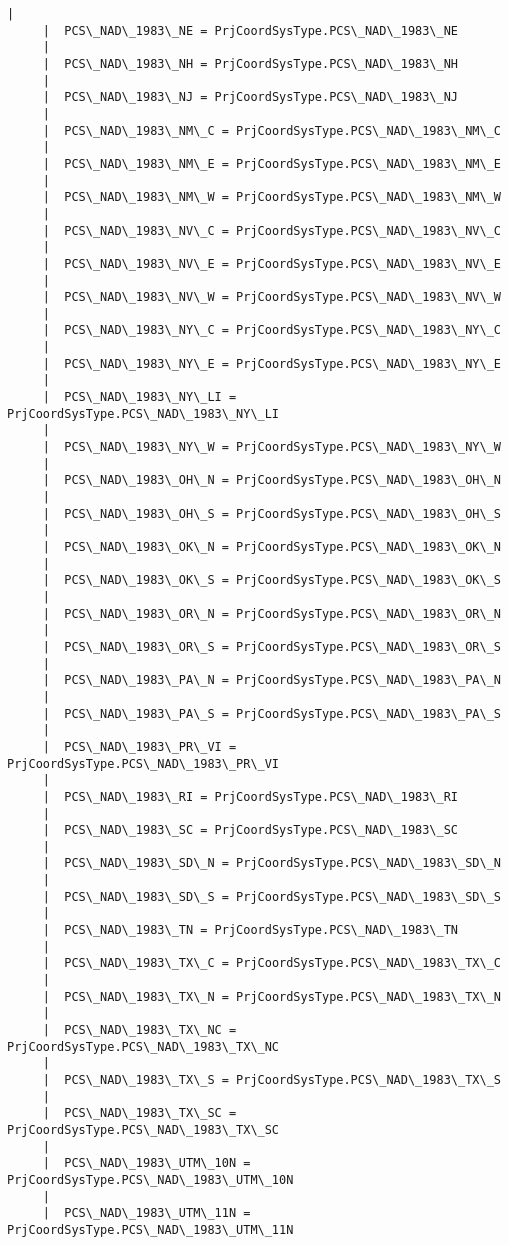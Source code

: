 \documentclass[11pt]{article}
\begin{document}
\begin{Verbatim}[commandchars=\\\{\}]
     |  
     |  PCS\_NAD\_1983\_NE = PrjCoordSysType.PCS\_NAD\_1983\_NE
     |  
     |  PCS\_NAD\_1983\_NH = PrjCoordSysType.PCS\_NAD\_1983\_NH
     |  
     |  PCS\_NAD\_1983\_NJ = PrjCoordSysType.PCS\_NAD\_1983\_NJ
     |  
     |  PCS\_NAD\_1983\_NM\_C = PrjCoordSysType.PCS\_NAD\_1983\_NM\_C
     |  
     |  PCS\_NAD\_1983\_NM\_E = PrjCoordSysType.PCS\_NAD\_1983\_NM\_E
     |  
     |  PCS\_NAD\_1983\_NM\_W = PrjCoordSysType.PCS\_NAD\_1983\_NM\_W
     |  
     |  PCS\_NAD\_1983\_NV\_C = PrjCoordSysType.PCS\_NAD\_1983\_NV\_C
     |  
     |  PCS\_NAD\_1983\_NV\_E = PrjCoordSysType.PCS\_NAD\_1983\_NV\_E
     |  
     |  PCS\_NAD\_1983\_NV\_W = PrjCoordSysType.PCS\_NAD\_1983\_NV\_W
     |  
     |  PCS\_NAD\_1983\_NY\_C = PrjCoordSysType.PCS\_NAD\_1983\_NY\_C
     |  
     |  PCS\_NAD\_1983\_NY\_E = PrjCoordSysType.PCS\_NAD\_1983\_NY\_E
     |  
     |  PCS\_NAD\_1983\_NY\_LI = PrjCoordSysType.PCS\_NAD\_1983\_NY\_LI
     |  
     |  PCS\_NAD\_1983\_NY\_W = PrjCoordSysType.PCS\_NAD\_1983\_NY\_W
     |  
     |  PCS\_NAD\_1983\_OH\_N = PrjCoordSysType.PCS\_NAD\_1983\_OH\_N
     |  
     |  PCS\_NAD\_1983\_OH\_S = PrjCoordSysType.PCS\_NAD\_1983\_OH\_S
     |  
     |  PCS\_NAD\_1983\_OK\_N = PrjCoordSysType.PCS\_NAD\_1983\_OK\_N
     |  
     |  PCS\_NAD\_1983\_OK\_S = PrjCoordSysType.PCS\_NAD\_1983\_OK\_S
     |  
     |  PCS\_NAD\_1983\_OR\_N = PrjCoordSysType.PCS\_NAD\_1983\_OR\_N
     |  
     |  PCS\_NAD\_1983\_OR\_S = PrjCoordSysType.PCS\_NAD\_1983\_OR\_S
     |  
     |  PCS\_NAD\_1983\_PA\_N = PrjCoordSysType.PCS\_NAD\_1983\_PA\_N
     |  
     |  PCS\_NAD\_1983\_PA\_S = PrjCoordSysType.PCS\_NAD\_1983\_PA\_S
     |  
     |  PCS\_NAD\_1983\_PR\_VI = PrjCoordSysType.PCS\_NAD\_1983\_PR\_VI
     |  
     |  PCS\_NAD\_1983\_RI = PrjCoordSysType.PCS\_NAD\_1983\_RI
     |  
     |  PCS\_NAD\_1983\_SC = PrjCoordSysType.PCS\_NAD\_1983\_SC
     |  
     |  PCS\_NAD\_1983\_SD\_N = PrjCoordSysType.PCS\_NAD\_1983\_SD\_N
     |  
     |  PCS\_NAD\_1983\_SD\_S = PrjCoordSysType.PCS\_NAD\_1983\_SD\_S
     |  
     |  PCS\_NAD\_1983\_TN = PrjCoordSysType.PCS\_NAD\_1983\_TN
     |  
     |  PCS\_NAD\_1983\_TX\_C = PrjCoordSysType.PCS\_NAD\_1983\_TX\_C
     |  
     |  PCS\_NAD\_1983\_TX\_N = PrjCoordSysType.PCS\_NAD\_1983\_TX\_N
     |  
     |  PCS\_NAD\_1983\_TX\_NC = PrjCoordSysType.PCS\_NAD\_1983\_TX\_NC
     |  
     |  PCS\_NAD\_1983\_TX\_S = PrjCoordSysType.PCS\_NAD\_1983\_TX\_S
     |  
     |  PCS\_NAD\_1983\_TX\_SC = PrjCoordSysType.PCS\_NAD\_1983\_TX\_SC
     |  
     |  PCS\_NAD\_1983\_UTM\_10N = PrjCoordSysType.PCS\_NAD\_1983\_UTM\_10N
     |  
     |  PCS\_NAD\_1983\_UTM\_11N = PrjCoordSysType.PCS\_NAD\_1983\_UTM\_11N

\end{Verbatim}
\end{document}
